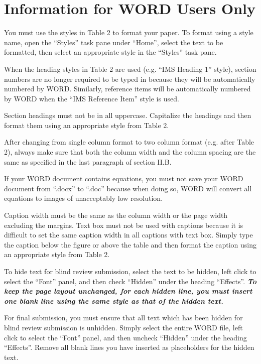 \documentclass[conference,10pt,letterpaper]{IEEEtran}%
\begin{document}

\section{Information for WORD Users Only}

You must use the styles in Table 2 to format your paper.  To format
using a style name, open the ``Styles'' task pane under ``Home'', select
the text to be formatted, then select an appropriate style in the
``Styles'' task pane.

When the heading styles in Table 2 are used (e.g. ``IMS Heading 1''
style), section numbers are no longer required to be typed in because
they will be automatically numbered by WORD. Similarly, reference
items will be automatically numbered by WORD when the ``IMS Reference
Item'' style is used.

Section headings must not be in all uppercase. Capitalize the headings
and then format them using an appropriate style from Table 2.

After changing from single column format to two column format (e.g.
after Table 2), always make sure that both the column width and the
column spacing are the same as specified in the last paragraph of
section II.B.

If your WORD document contains equations, you must not save your WORD
document from ``.docx'' to ``.doc'' because when doing so, WORD will
convert all equations to images of unacceptably low resolution.

Caption width must be the same as the column width or the page width
excluding the margins. Text box must not be used with captions because
it is difficult to set the same caption width in all captions with
text box. Simply type the caption below the figure or above the table
and then format the caption using an appropriate style from Table 2.

To hide text for blind review submission, select the text to be
hidden, left click to select the ``Font'' panel, and then check
``Hidden'' under the heading ``Effects''. {\bfseries\itshape To keep
the page layout unchanged, for each hidden line, you must insert one
blank line using the same style as that of the hidden text.}

For final submission, you must ensure that all text which has been
hidden for blind review submission is unhidden. Simply select the
entire WORD file, left click to select the ``Font'' panel, and then
uncheck ``Hidden'' under the heading ``Effects''.  Remove all blank
lines you have inserted as placeholders for the hidden text.
\end{document}
